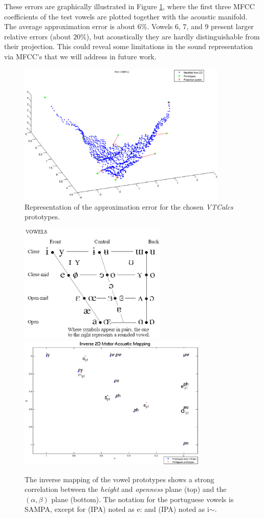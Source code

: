 These errors are graphically illustrated in Figure \ref{fig:convport},
where the first three MFCC coefficients of the test vowels are plotted
together with the acoustic manifold. The average approximation error
is about $6\%$. Vowels $6$, $7$, and $9$ present larger relative
errors (about $20\%$), but acoustically they are hardly
distinguishable from their projection. This could reveal some
limitations in the sound representation via MFCC's that we will
address in future work.

\begin{figure}[!h]
  \centering
  \includegraphics[width=100mm]{include/vowels/images/convex-d2-25-mar}
  \caption{Representation of the approximation error for the chosen
    \emph{VTCalcs} prototypes.}
  \label{fig:convport}
\end{figure}

\begin{figure}[!h]
  \centering
  \includegraphics[width=70mm]{include/vowels/images/vowels}
  \includegraphics[width=90mm]{include/vowels/images/2dmam}
  \caption{The inverse mapping of the vowel prototypes shows a strong
    correlation between the \emph{height} and \emph{openness} plane
    (top) and the $(\alpha,\beta)$ plane (bottom). The notation for
    the portuguese vowels is SAMPA, except for  \textipa{[e]} (IPA)
    noted as e: and  \textipa{[1]} (IPA) noted as i$\sim$.}
  \label{fig:motormaeda}
\end{figure}

